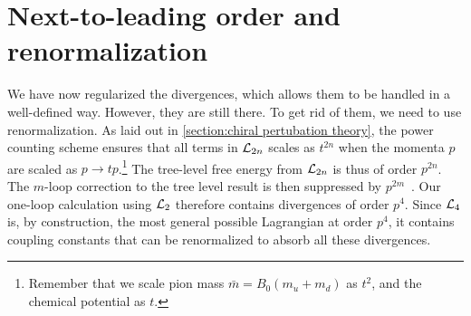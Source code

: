 \section{Next-to-leading order and renormalization}

We have now regularized the divergences, which allows them to be handled in a well-defined way.
However, they are still there.
To get rid of them, we need to use renormalization.
As laid out in \autoref{section:chiral pertubation theory}, the power counting scheme ensures that all terms in $\mathcal{L}_{2n}$ scales as $t^{2n}$ when the momenta $p$ are scaled as  $p \rightarrow t p$.\footnote{Remember that we scale pion mass $\bar m = B_0(m_u + m_d)$ as $t^2$, and the chemical potential as $t$.}
The tree-level free energy from $\mathcal{L}_{2n}$ is thus of order $p^{2n}$.
The $m$-loop correction to the tree level result is then suppressed by $p^{2m}$~\cite{WeinbergPhenom,Gasser-Leutwyler:chiral}.
Our one-loop calculation using $\mathcal{L}_2$ therefore contains divergences of order $p^{4}$. 
Since $\mathcal{L}_4$ is, by construction, the most general possible Lagrangian at order $p^4$, it contains coupling constants that can be renormalized to absorb all these divergences.

